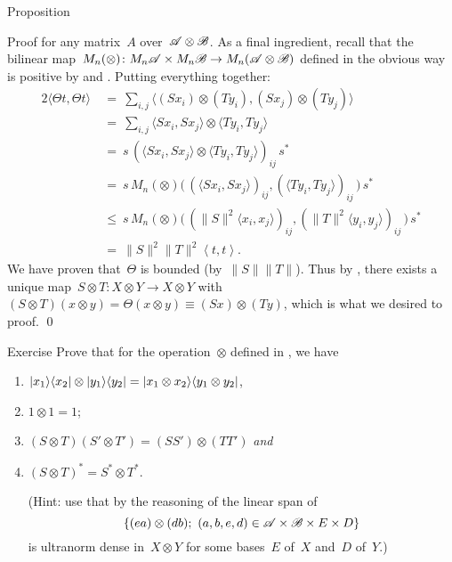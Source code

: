\documentclass[b]{subfiles}
\begin{document}
\begin{parsec}
\begin{point}{Proposition}
\begin{point}{Proof}
    for any matrix~$A$ over~$\mathscr{A} \otimes \mathscr{B}$.
As a final ingredient,
    recall that the
    bilinear map~$M_n(\otimes) \colon M_n \mathscr{A} \times M_n \mathscr{B} \to
                M_n( \mathscr{A} \otimes \mathscr{B})$
        defined in the obvious way
        is positive by  and .
    Putting everything together:
\begin{alignat*}{2}
    \langle \Theta t, \Theta t \rangle
        & \ = \ \sum_{i,j} \langle 
    (Sx_i) \otimes (Ty_i),
    (Sx_j) \otimes (Ty_j)
            \rangle  \\
        & \ = \ \sum_{i,j} 
    \langle Sx_i, S x_j \rangle
    \otimes \langle Ty_i, T y_j \rangle \\
    & \ = \ 
    s \,
    \left( 
    \langle Sx_i, S x_j \rangle
    \otimes \langle Ty_i, T y_j \rangle
\right)_{ij}  \,
     s^* \\
    & \ = \ 
     s \,
M_n(\otimes) \bigl(\,
    \left( 
    \langle Sx_i, S x_j \rangle \right)_{ij},
\left( \langle Ty_i, T y_j \rangle \right)_{ij} \,\bigr) 
\, s^* \\
    & \ \leq \ 
s \,
M_n(\otimes) \bigl(\,
    ( 
    \|S\|^2 \langle x_i,  x_j \rangle )_{ij},
(\|T\|^2 \langle y_i,  y_j \rangle )_{ij} \,\bigr) 
\, s^* \\
        & \ = \
    \|S\|^2\|T\|^2 \left<t,t\right>.
\end{alignat*}
We have proven that~$\Theta$ is bounded (by~$\|S\|\|T\|$).
Thus by ,
    there exists a unique map~$S \otimes T \colon X\otimes Y \to X\otimes Y$
    with~$(S \otimes T) (x \otimes y) = \Theta(x \otimes y)
        \equiv (S x) \otimes (Ty)$,
        which is what we desired to proof. \qed
\end{point}
\end{point}
\begin{point}[hilbmod-tensor-ketbra]{Exercise}%
Prove that for the
operation~$\otimes$ defined in , we have
\begin{enumerate}
    \item $\left|x_1\right>\!\left<x_2\right| \otimes \left|y_1\right>\!\left<y_2\right|
            = \left|x_1\otimes x_2\right>\!\left<y_1\otimes y_2\right|$,
        \item $1 \otimes 1 = 1$;
    \item $(S \otimes T) (S' \otimes T') = (SS' ) \otimes (TT')$
                \emph{and}
            \item $(S \otimes T)^* = S^* \otimes T^*$.

    (Hint:
    use that by the reasoning of 
    the linear
    span of
    \begin{equation*}
    \{ (e a) \otimes (d b); \ (a,b,e,d) \in \mathscr{A} \times \mathscr{B}
                    \times E \times D\}
    \end{equation*}
        is ultranorm dense in~$X \otimes Y$
        for some bases~$E$ of~$X$ and~$D$ of~$Y$.)


\end{enumerate}
\end{point}
\end{parsec}
\end{document}
